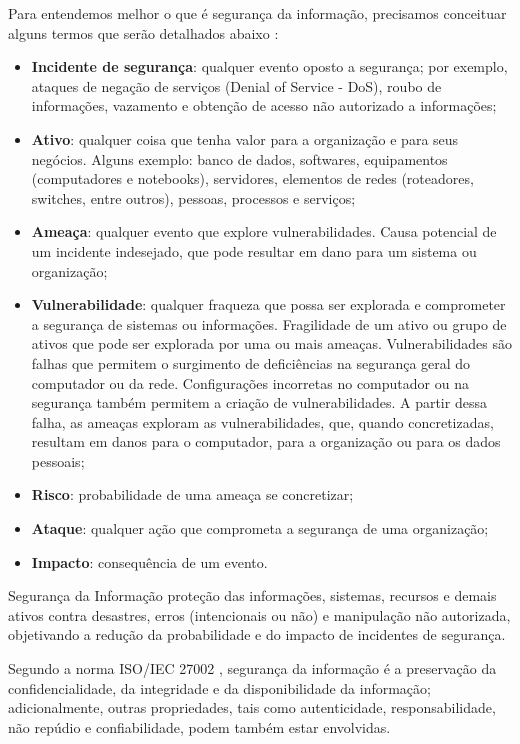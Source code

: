 \documentclass[
	12pt,				
	openright,		
	twoside,	
	a4paper,
	english,	
	brazil	
	]{abntex2}
\begin{document}
Para entendemos melhor o que é segurança da informação, precisamos conceituar alguns termos que serão detalhados abaixo \cite{esr-gestao}:
\begin{itemize}
 \item \textbf{Incidente de segurança}: qualquer evento oposto a segurança; por exemplo, ataques de negação de serviços (Denial of Service - DoS), roubo de informações, vazamento e obtenção de acesso não autorizado a informações;
 \item \textbf{Ativo}: qualquer coisa que tenha valor para a organização e para seus negócios. Alguns exemplo: banco de dados, softwares, equipamentos (computadores e notebooks), servidores, elementos de redes (roteadores, switches, entre outros), pessoas, processos e serviços;
 \item \textbf{Ameaça}: qualquer evento que explore vulnerabilidades. Causa potencial de um incidente indesejado, que pode resultar em dano para um sistema ou organização;
 \item \textbf{Vulnerabilidade}: qualquer fraqueza que possa ser explorada e comprometer a segurança de sistemas ou informações. Fragilidade de um ativo ou grupo de ativos que pode ser explorada por uma ou mais ameaças. Vulnerabilidades são falhas que permitem o surgimento de deficiências na segurança geral do computador ou da rede. Configurações incorretas no computador ou na segurança também permitem a criação de vulnerabilidades. A partir dessa falha, as ameaças exploram as vulnerabilidades, que, quando concretizadas, resultam em danos para o computador, para a organização ou para os dados pessoais;
 \item \textbf{Risco}: probabilidade de uma ameaça se concretizar;
 \item \textbf{Ataque}: qualquer ação que comprometa a segurança de uma organização;
 \item \textbf{Impacto}: consequência de um evento.
\end{itemize}

Segurança da Informação proteção das informações, sistemas, recursos e demais ativos contra desastres, erros (intencionais ou não) e manipulação não autorizada, objetivando a redução da probabilidade e do impacto de incidentes de segurança.

Segundo a norma ISO/IEC 27002 \cite{isoiec27002}, segurança da informação é a preservação da confidencialidade, da integridade e da disponibilidade da informação; adicionalmente, outras propriedades, tais como autenticidade, responsabilidade, não repúdio e confiabilidade, podem também estar envolvidas.
\end{document}
